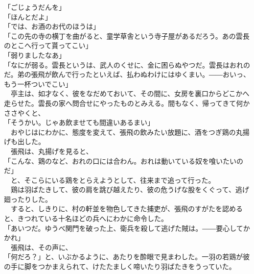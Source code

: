 \documentclass[
  paper=a5,
  fontsize=10pt,
  jafontsize=9.5pt,
  tate,                  %
  open_bracket_pos=nibu, %
]{jlreq}
\begin{document}
「ごじょうだんを」\\


「ほんとだよ」\\


「では、お酒のお代のほうは」\\


「この先の寺の横丁を曲がると、童学草舎という寺子屋があるだろう。あの雲長のとこへ行って貰ってこい」\\


「弱りましたなあ」\\


「なにが弱る。雲長というは、武人のくせに、金に困らぬやつだ。雲長はおれのだ。弟の張飛が飲んで行ったといえば、払わぬわけにはゆくまい。――おいっ、もう一杯ついでこい」\\


　亭主は、如才なく、彼をなだめておいて、その間に、女房を裏口からどこかへ走らせた。雲長の家へ問合せにやったものとみえる。間もなく、帰ってきて何かささやくと、\\


「そうかい。じゃあ飲ませても間違いあるまい」\\


　おやじはにわかに、態度を変えて、張飛の飲みたい放題に、酒をつぎ鶏の丸揚げも出した。\\


　張飛は、丸揚げを見ると、\\


「こんな、鶏のなど、おれの口には合わん。おれは動いている奴を喰いたいのだ」\\


　と、そこらにいる鶏をとらえようとして、往来まで追って行った。\\


　鶏は羽ばたきして、彼の肩を跳び越えたり、彼の危うげな股をくぐって、逃げ廻ったりした。\\


　すると、しきりに、村の軒並を物色してきた捕吏が、張飛のすがたを認めると、きつれている十名ほどの兵へにわかに命令した。\\


「あいつだ。ゆうべ関門を破った上、衛兵を殺して逃げた賊は。――要心してかかれ」\\


　張飛は、その声に、\\


「何だろ？」と、いぶかるように、あたりを酔眼で見まわした。一羽の若鶏が彼の手に脚をつかまえられて、けたたましく啼いたり羽ばたきをうっていた。\\
\end{document}
